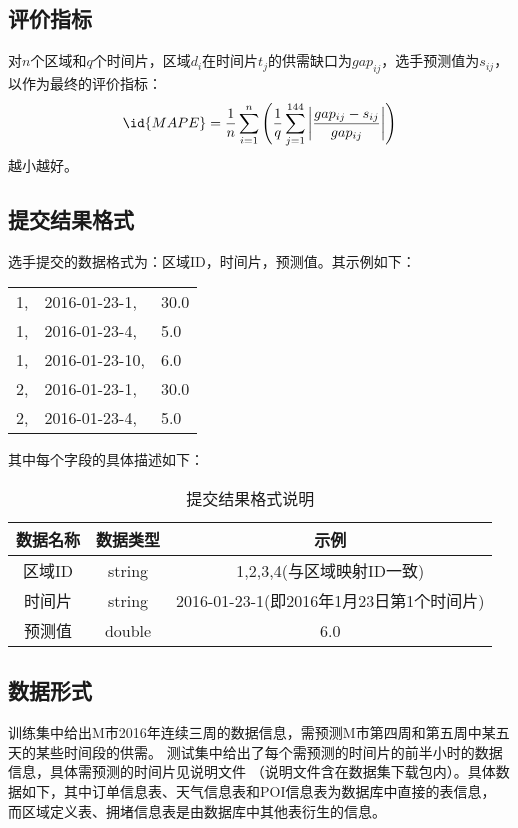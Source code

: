 \documentclass[hyperref,UTF8]{ctexart}
\theoremstyle{definition}
\theoremstyle{remark}
\numberwithin{equation}{subsection}
\begin{document}
	
\subsection{评价指标}
\label{subsec:evaluate_indicator}

	对$n$个区域和$q$个时间片，区域$d_i$在时间片$t_j$的供需缺口为$gap_{ij}$，选手预测值为$s_{ij}$，
以作为最终的评价指标：
\[
	\id{MAPE} = \frac{1}{n} \sum_{i=1}^{n}{\Bigg( \frac{1}{q}\sum_{j=1}^{144}\bigg| \frac{gap_{ij} - s_{ij}}{gap_{ij}} \bigg| \Bigg)}
\]
越小越好。


\subsection{提交结果格式}
\label{subsec:submit_format}

	选手提交的数据格式为：区域ID，时间片，预测值。其示例如下：\\
	\begin{tabular}{lll}
		1, &2016-01-23-1, &30.0 	\\
		1, &2016-01-23-4, &5.0 		\\
		1, &2016-01-23-10, &6.0 	\\
		2, &2016-01-23-1, &30.0 	\\
		2, &2016-01-23-4, &5.0 	\\
	\end{tabular}
	
	
	其中每个字段的具体描述如下：
	\begin{table}[H]
    \centering
	\caption{提交结果格式说明}
	\begin{tabular}{|c|c|c|}
    \hline
		数据名称	&	数据类型	&	示例							\\
    \hline
		区域ID		&	string		&	1,2,3,4(与区域映射ID一致)		\\
		时间片		&	string		&	2016-01-23-1(即2016年1月23日第1个时间片) \\
		预测值		&	double		&	6.0	\\
    \hline
	\end{tabular}
	\end{table}
	
\subsection{数据形式}
\label{subsec:data_format}

	训练集中给出M市2016年连续三周的数据信息，需预测M市第四周和第五周中某五天的某些时间段的供需。
测试集中给出了每个需预测的时间片的前半小时的数据信息，具体需预测的时间片见说明文件
（说明文件含在数据集下载包内）。具体数据如下，其中订单信息表、天气信息表和POI信息表为数据库中直接的表信息，
而区域定义表、拥堵信息表是由数据库中其他表衍生的信息。
\end{document}
